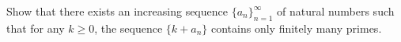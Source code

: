 Show that there exists an increasing sequence $\{a_{n}\}_{n=1}^{\infty}$ of natural numbers such that for any $k \geq 0$, the sequence $\{k + a_{n}\}$ contains only finitely many primes.
